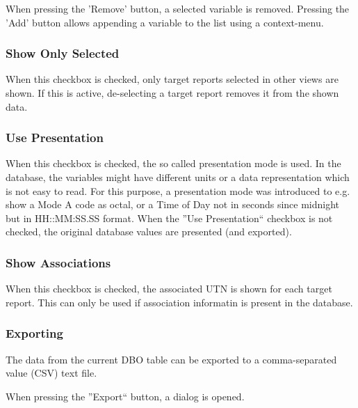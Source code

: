 When pressing the 'Remove' button, a selected variable is removed.  Pressing the 'Add' button allows appending a variable to the list using a context-menu.

\subsubsection{Show Only Selected}
When this checkbox is checked, only target reports selected in other views are shown. If this is active, de-selecting a target report removes it from the shown data.

\subsubsection{Use Presentation}
When this checkbox is checked, the so called presentation mode is used. In the database, the variables might have different units or a data representation which is not easy to read. For this purpose, a presentation mode was introduced to e.g. show a Mode A code as octal, or a Time of Day not in seconds since midnight but in HH::MM:SS.SS format. When the ''Use Presentation`` checkbox is not checked, the original database values are presented (and exported).

\subsubsection{Show Associations}
When this checkbox is checked, the associated UTN is shown for each target report. This can only be used if association informatin is present in the database.


\subsubsection{Exporting}
\label{sec:exporting}

The data from the current DBO table can be exported to a comma-separated value (CSV) text file. 

When pressing the ''Export`` button, a dialog is opened.

